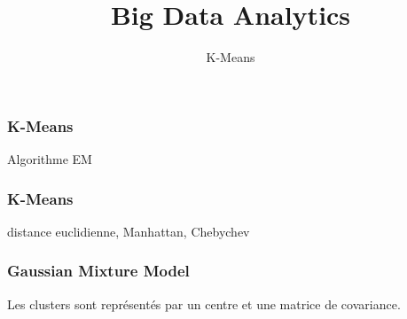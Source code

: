 \documentclass{formation}
\title{Big Data Analytics}
\subtitle{K-Means}
\begin{document}
\maketitle

\begin{frame}
  \frametitle{K-Means}
  Algorithme EM
\end{frame}

\begin{frame}
  \frametitle{K-Means}
  distance euclidienne, Manhattan, Chebychev
\end{frame}

\begin{frame}
  \frametitle{Gaussian Mixture Model}
  Les clusters sont représentés par un centre et une matrice de covariance.
\end{frame}
\end{document}
